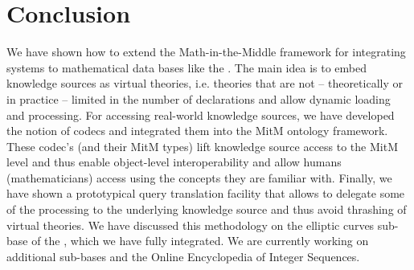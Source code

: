 \section{Conclusion}\label{sec:concl}

We have shown how to extend the Math-in-the-Middle framework for integrating systems to mathematical data bases like the \lmfdb. 
The main idea is to embed knowledge sources as virtual theories, i.e. theories that are not -- theoretically or in practice -- limited in the number of declarations and allow dynamic loading and processing. 
For accessing real-world knowledge sources, we have developed the notion of codecs and integrated them into the MitM ontology framework. 
These codec's (and their MitM types) lift knowledge source access to the MitM level and thus enable object-level interoperability and allow humans (mathematicians) access using the concepts they are familiar with. 
Finally, we have shown a prototypical query translation facility that allows to delegate some of the processing to the underlying knowledge source and thus avoid thrashing of virtual theories. 
We have discussed this methodology on the elliptic curves sub-base of the \lmfdb, which we have fully integrated. 
We are currently working on additional \lmfdb sub-bases and the Online Encyclopedia of Integer Sequences. 



